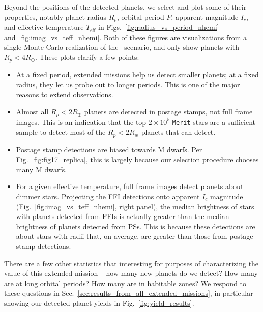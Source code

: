 Beyond the positions of the detected planets, we select and plot some of their properties, notably planet radius $R_p$, orbital period $P$, apparent magnitude $I_c$, and effective temperature $T_\mathrm{eff}$ in Figs.~\ref{fig:radius_vs_period_nhemi} and~\ref{fig:imag_vs_teff_nhemi}.
Both of these figures are visualizations from a single Monte Carlo realization of the \nhemi\ scenario, and only show planets with $R_p < 4R_\oplus$.
These plots clarify a few points:
\begin{itemize}
	\item At a fixed period, extended missions help us detect smaller planets; at a fixed radius, they let us probe out to longer periods. This is one of the major reasons to extend \tesss observations.
	\item Almost all $R_p<2R_\oplus$ planets are detected in postage stamps, not full frame images. This is an indication that the top $2\times10^5$ \texttt{Merit} stars are a sufficient sample to detect most of the $R_p<2R_\oplus$ planets that \tess can detect.
	\item Postage stamp detections are biased towards M dwarfs. Per Fig.~\ref{fig:fig17_replica}, this is largely because our selection procedure chooses many M dwarfs.
	\item For a given effective temperature, full frame images detect planets about dimmer stars. Projecting the FFI detections onto apparent $I_c$ magnitude (Fig.~\ref{fig:imag_vs_teff_nhemi}, right panel), the median brightness of stars with planets detected from FFIs is actually greater than the median brightness of planets detected from PSs. This is because these detections are about stars with radii that, on average, are greater than those from postage-stamp detections.
\end{itemize}

There are a few other statistics that interesting for purposes of characterizing the value of this extended mission -- how many new planets do we detect? How many are at long orbital periods? How many are in habitable zones? We respond to these questions in Sec.~\ref{sec:results_from_all_extended_missions}, in particular showing our detected planet yields in Fig.~\ref{fig:yield_results}.